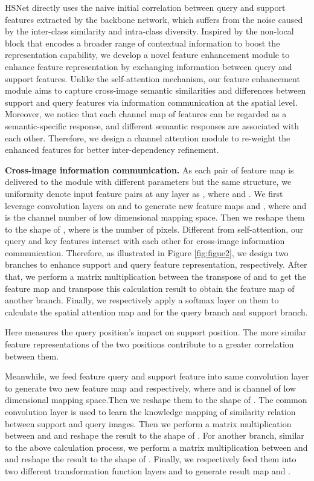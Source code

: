 \documentclass[journal]{IEEEtran}
\begin{document}
HSNet \cite{min2021hypercorrelation} directly uses the naive initial correlation between query and support features extracted by the backbone network, which suffers from the noise caused by the inter-class similarity and intra-class diversity. Inspired by the non-local block \cite{wang2018non} that encodes a broader range of contextual information to boost the representation capability, we develop a novel feature enhancement module to enhance feature representation by exchanging information between query and support features. Unlike the self-attention mechanism, our feature enhancement module aims to capture cross-image semantic similarities and differences between support and query features via information communication at the spatial level. Moreover, we notice that each channel map of features can be regarded as a semantic-specific response, and different semantic responses are associated with each other. Therefore, we design a channel attention module to re-weight the enhanced features for better inter-dependency refinement.\par



\textbf{Cross-image information communication.} As each pair of feature map is delivered to the module with different parameters but the same structure, we uniformity denote input feature pairs at any layer as , where  and . We first leverage convolution layers on  and  to generate new feature maps  and , where  and  is the channel number of low dimensional mapping space. Then we reshape them to the shape of , where  is the number of pixels. Different from self-attention, our query  and key  features interact with each other for cross-image information communication. Therefore, as illustrated in Figure \ref{fig:figue2}, we design two branches to enhance support and query feature representation, respectively. After that, we perform a matrix multiplication between the transpose of  and  to get the feature map and transpose this calculation result to obtain the feature map of another branch. Finally, we respectively apply a softmax layer on them to calculate the spatial attention map  and  for the query branch and support branch.


Here  measures the query  position's impact on support  position. The more similar feature representations of the two positions contribute to a greater correlation between them. \par



Meanwhile, we feed feature query  and support  feature into same convolution layer to generate two new feature map  and  respectively, where  and  is channel of low dimensional mapping space.Then we reshape them to the shape of . The common convolution layer is used to learn the knowledge mapping of similarity relation between support and query images. Then we perform a matrix multiplication between  and  and reshape the result to the shape of . For another branch, similar to the above calculation process, we perform a matrix multiplication between  and  and reshape the result to the shape of . Finally, we respectively feed them into two different transformation function layers  and  to generate result map  and . 
\end{document}
